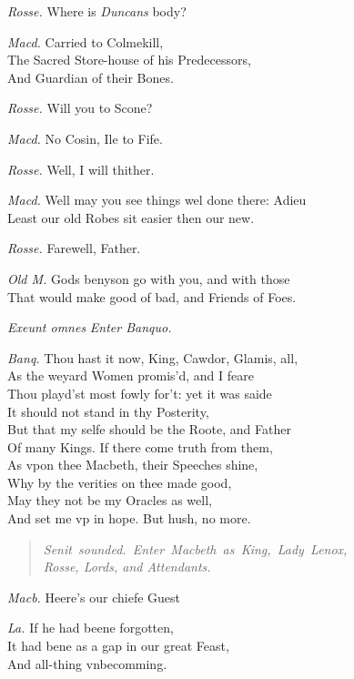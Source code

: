 \documentclass[12pt]{sides}
\newcommand{\StageDir}[1]{\begin{quote}\centering\em #1\end{quote}}
\newcommand{\clStageDir}[1]{\hspace*{\fill}\textit{#1}\hspace*{\fill}}
\newcommand{\elStageDir}[1]{\hfill\textit{#1}}
\newcommand{\dia}[1]{\hskip 15pt\textit{#1}\hskip 6pt}
\begin{document}
\begin{multicols}{2}
            \dia{Rosse.} Where is \textit{Duncans} body?

            \dia{Macd.} Carried to Colmekill, \\ The Sacred Store-house of his Predecessors, \\ And Guardian of their Bones.

            \dia{Rosse.} Will you to Scone?

            \dia{Macd.} No Cosin, Ile to Fife.

            \dia{Rosse.} Well, I will thither.

            \dia{Macd.} Well may you see things wel done there: Adieu \\ Least our old Robes sit easier then our new.

            \dia{Rosse.} Farewell, Father.

            \dia{Old M.} Gods benyson go with you, and with those \\ That would make good of bad, and Friends of Foes.

            \elStageDir{Exeunt omnes}
            \clStageDir{Enter Banquo.}

            \dia{Banq.} Thou hast it now, King, Cawdor, Glamis, all, \\ As the weyard Women promis'd, and I feare \\ Thou playd'st most fowly for't: yet it was saide \\ It should not stand in thy Posterity, \\ But that my selfe should be the Roote, and Father \\ Of many Kings. If there come truth from them, \\ As vpon thee Macbeth, their Speeches shine, \\ Why by the verities on thee made good, \\ May they not be my Oracles as well, \\ And set me vp in hope. But hush, no more.

            \StageDir{\mbox{Senit sounded. Enter Macbeth as King, Lady Lenox, }\\Rosse, Lords, and Attendants.} %

            \dia{Macb.} Heere's our chiefe Guest

            \dia{La.} If he had beene forgotten, \\ It had bene as a gap in our great Feast, \\ And all-thing vnbecomming.


\end{multicols}
\end{document}
